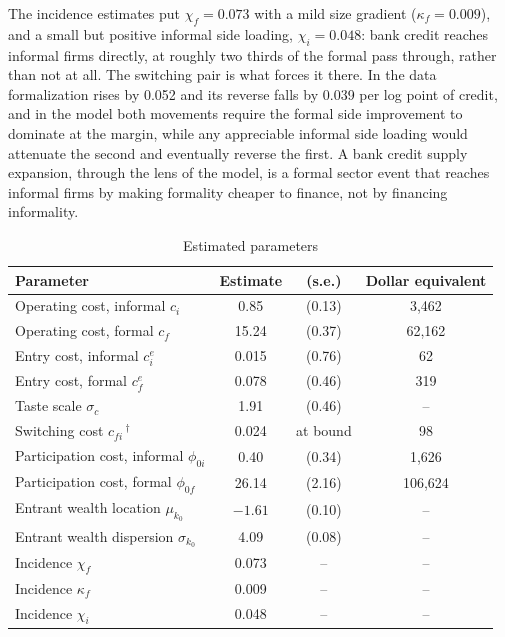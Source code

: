\documentclass[12pt]{article}
\begin{document}
The incidence estimates put $\chi_f = 0.073$ with a mild size gradient ($\kappa_f = 0.009$), and a small but positive informal side loading, $\chi_i = 0.048$: bank credit reaches informal firms directly, at roughly two thirds of the formal pass through, rather than not at all. The switching pair is what forces it there. In the data formalization rises by 0.052 and its reverse falls by 0.039 per log point of credit, and in the model both movements require the formal side improvement to dominate at the margin, while any appreciable informal side loading would attenuate the second and eventually reverse the first. A bank credit supply expansion, through the lens of the model, is a formal sector event that reaches informal firms by making formality cheaper to finance, not by financing informality.

\begin{table}[H]
    \centering\small
    \caption{Estimated parameters}
    \label{tab:est-theta}
    \begin{tabular}{lccc}
        \toprule
        Parameter & Estimate & (s.e.) & Dollar equivalent \\
        \midrule
        Operating cost, informal $c_{i}$ & 0.85 & (0.13) & 3{,}462 \\
        Operating cost, formal $c_{f}$ & 15.24 & (0.37) & 62{,}162 \\
        Entry cost, informal $c^{e}_{i}$ & 0.015 & (0.76) & 62 \\
        Entry cost, formal $c^{e}_{f}$ & 0.078 & (0.46) & 319 \\
        Taste scale $\sigma_{c}$ & 1.91 & (0.46) & -- \\
        Switching cost $c_{fi}$\,$^{\dagger}$ & 0.024 & at bound & 98 \\
        Participation cost, informal $\phi_{0i}$ & 0.40 & (0.34) & 1{,}626 \\
        Participation cost, formal $\phi_{0f}$ & 26.14 & (2.16) & 106{,}624 \\
        Entrant wealth location $\mu_{k_{0}}$ & $-1.61$ & (0.10) & -- \\
        Entrant wealth dispersion $\sigma_{k_{0}}$ & 4.09 & (0.08) & -- \\
        Incidence $\chi_{f}$ & 0.073 & -- & -- \\
        Incidence $\kappa_{f}$ & 0.009 & -- & -- \\
        Incidence $\chi_{i}$ & 0.048 & -- & -- \\
        \bottomrule
    \end{tabular}

\end{table}
\end{document}
